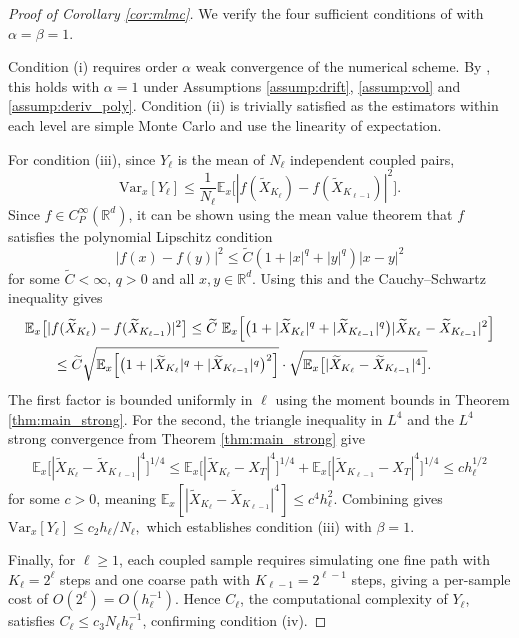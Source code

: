 \documentclass[11pt]{article}
\begin{document}
\begin{proof}[Proof of Corollary \ref{cor:mlmc}]
We verify the four sufficient conditions of \cite[Theorem 3.1]{Giles:08} with $\alpha = \beta = 1$.

Condition (i) requires order $\alpha$ weak convergence of the numerical scheme. By \cite[Theorem 3.2]{skew:ima}, this holds with $\alpha = 1$ under Assumptions \ref{assump:drift}, \ref{assump:vol} and \ref{assump:deriv_poly}. Condition (ii) is trivially satisfied as the estimators within each level are simple Monte Carlo and use the linearity of expectation.  

For condition (iii), since $Y_\ell$ is the mean of $N_\ell$ independent coupled pairs,
$$\mathrm{Var}_x[Y_\ell] \leq \frac{1}{N_\ell} \mathbb{E}_x \bigl[|f(\widetilde{X}_{K_\ell}) - f(\widetilde{X}_{K_{\ell-1}})|^2\bigr].$$
Since $f \in C_P^\infty(\mathbb{R}^d)$, it can be shown using the mean value theorem that $f$ satisfies the polynomial Lipschitz condition
\[
|f(x) - f(y)|^2 \leq \widetilde{C}(1+|x|^q + |y|^q)|x-y|^2
\] 
for some $\widetilde{C} < \infty$, $q > 0$ and all $x,y\in\mathbb{R}^d$.  Using this and the Cauchy--Schwartz inequality gives
\begin{align*}
& \mathbb{E}_x \bigl[|f(\widetilde{X}_{K_\ell}) - f(\widetilde{X}_{K_{\ell-1}})|^2\bigr] 
\leq 
\widetilde{C}~\mathbb{E}_x \Bigl[\bigl(1 + |\widetilde{X}_{K_\ell}|^q + |\widetilde{X}_{K_{\ell-1}}|^q\bigr)|\widetilde{X}_{K_\ell} - \widetilde{X}_{K_{\ell-1}}|^2\Bigr]
\\
&\qquad \leq \widetilde{C}\sqrt{\mathbb{E}_x\Bigl[\bigl(1 + |\widetilde{X}_{K_\ell}|^q + |\widetilde{X}_{K_{\ell-1}}|^q\bigr)^2\Bigr]} \cdot \sqrt{\mathbb{E}_x\bigl[|\widetilde{X}_{K_\ell} - \widetilde{X}_{K_{\ell-1}}|^4\bigr]}.
\end{align*}
The first factor is bounded uniformly in $\ell$ using the moment bounds in Theorem \ref{thm:main_strong}. For the second, the triangle inequality in $L^4$ and the $L^4$ strong convergence from Theorem \ref{thm:main_strong} give
\begin{align*}
\mathbb{E}_x\bigl[|\widetilde{X}_{K_\ell} - \widetilde{X}_{K_{\ell-1}}|^4\bigr]^{1/4} 
\leq 
\mathbb{E}_x\bigl[|\widetilde{X}_{K_\ell} - X_T|^4\bigr]^{1/4} + \mathbb{E}_x\bigl[|\widetilde{X}_{K_{\ell-1}} - X_T|^4\bigr]^{1/4} 
\leq 
c h_\ell^{1/2}
\end{align*}
for some $c > 0$, meaning $\mathbb{E}_x[|\widetilde{X}_{K_\ell} - \widetilde{X}_{K_{\ell-1}}|^4] \leq c^4 h_\ell^2$. Combining gives
$
\mathrm{Var}_x[Y_\ell] \leq c_2 h_\ell/N_\ell,
$
which establishes condition (iii) with $\beta = 1$.

Finally, for $\ell \geq 1$, each coupled sample requires simulating one fine path with $K_\ell = 2^\ell$ steps and one coarse path with $K_{\ell-1} = 2^{\ell-1}$ steps, giving a per-sample cost of $O(2^\ell) = O(h_\ell^{-1})$. Hence $C_\ell$, the computational complexity of $Y_\ell$, satisfies $C_\ell \leq c_3 N_\ell h_\ell^{-1}$, confirming condition (iv).
\end{proof}
\end{document}
